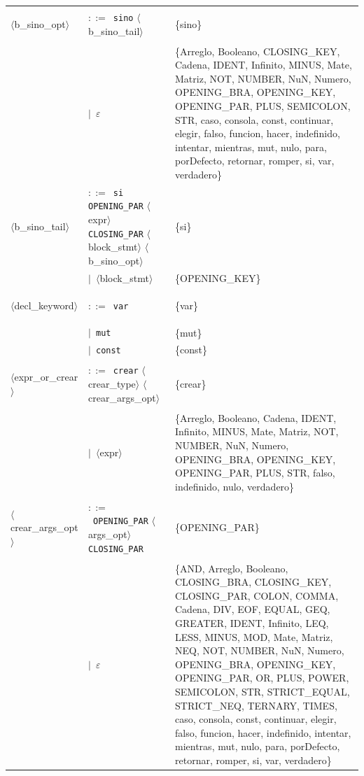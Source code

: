 \documentclass[10pt]{article}
\begin{document}
{\begin{longtable}{@{} p{2.0cm} p{6.9cm} p{6.9cm} @{}}
  \midrule
  \textcolor{ntcolor}{\parbox[t]{1.8cm}{\raggedright$\langle$b\_\allowbreak{}sino\_\allowbreak{}opt$\rangle$}} & $::=$~\texttt{sino} $\langle$b\_sino\_tail$\rangle$ & \{sino\} \\
   & $\mid$~$\varepsilon$ & \{Arreglo, Booleano, CLOSING\_KEY, Cadena, IDENT, Infinito, MINUS, Mate, Matriz, NOT, NUMBER, NuN, Numero, OPENING\_BRA, OPENING\_KEY, OPENING\_PAR, PLUS, SEMICOLON, STR, caso, consola, const, continuar, elegir, falso, funcion, hacer, indefinido, intentar, mientras, mut, nulo, para, porDefecto, retornar, romper, si, var, verdadero\} \\
  \midrule
  \textcolor{ntcolor}{\parbox[t]{1.8cm}{\raggedright$\langle$b\_\allowbreak{}sino\_\allowbreak{}tail$\rangle$}} & $::=$~\texttt{si} \texttt{OPENING\_PAR} $\langle$expr$\rangle$ \texttt{CLOSING\_PAR} $\langle$block\_stmt$\rangle$ $\langle$b\_sino\_opt$\rangle$ & \{si\} \\
   & $\mid$~$\langle$block\_stmt$\rangle$ & \{OPENING\_KEY\} \\
  \midrule
  \textcolor{ntcolor}{\parbox[t]{1.8cm}{\raggedright$\langle$decl\_\allowbreak{}keyword$\rangle$}} & $::=$~\texttt{var} & \{var\} \\
   & $\mid$~\texttt{mut} & \{mut\} \\
   & $\mid$~\texttt{const} & \{const\} \\
  \midrule
  \textcolor{ntcolor}{\parbox[t]{1.8cm}{\raggedright$\langle$expr\_\allowbreak{}or\_\allowbreak{}crear$\rangle$}} & $::=$~\texttt{crear} $\langle$crear\_type$\rangle$ $\langle$crear\_args\_opt$\rangle$ & \{crear\} \\
   & $\mid$~$\langle$expr$\rangle$ & \{Arreglo, Booleano, Cadena, IDENT, Infinito, MINUS, Mate, Matriz, NOT, NUMBER, NuN, Numero, OPENING\_BRA, OPENING\_KEY, OPENING\_PAR, PLUS, STR, falso, indefinido, nulo, verdadero\} \\
  \midrule
  \textcolor{ntcolor}{\parbox[t]{1.8cm}{\raggedright$\langle$crear\_\allowbreak{}args\_\allowbreak{}opt$\rangle$}} & $::=$~\texttt{OPENING\_PAR} $\langle$args\_opt$\rangle$ \texttt{CLOSING\_PAR} & \{OPENING\_PAR\} \\
   & $\mid$~$\varepsilon$ & \{AND, Arreglo, Booleano, CLOSING\_BRA, CLOSING\_KEY, CLOSING\_PAR, COLON, COMMA, Cadena, DIV, EOF, EQUAL, GEQ, GREATER, IDENT, Infinito, LEQ, LESS, MINUS, MOD, Mate, Matriz, NEQ, NOT, NUMBER, NuN, Numero, OPENING\_BRA, OPENING\_KEY, OPENING\_PAR, OR, PLUS, POWER, SEMICOLON, STR, STRICT\_EQUAL, STRICT\_NEQ, TERNARY, TIMES, caso, consola, const, continuar, elegir, falso, funcion, hacer, indefinido, intentar, mientras, mut, nulo, para, porDefecto, retornar, romper, si, var, verdadero\} \\

\end{longtable}}
\end{document}
